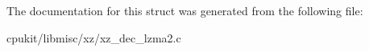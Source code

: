 The documentation for this struct was generated from the following file\+:\begin{DoxyCompactItemize}
\item 
cpukit/libmisc/xz/xz\+\_\+dec\+\_\+lzma2.\+c\end{DoxyCompactItemize}
